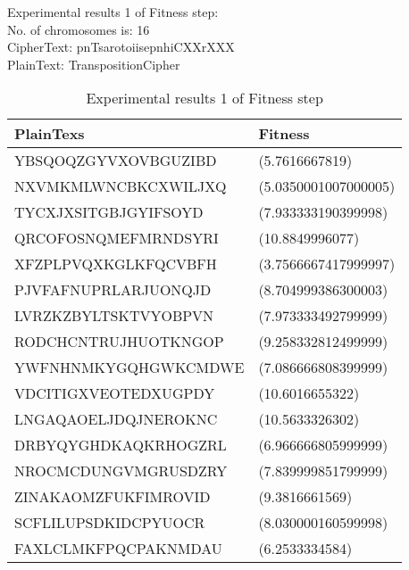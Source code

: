 \textsf{Experimental results 1 of Fitness step:}\\
    \colorbox{blue!30}{\textsf{     No. of chromosomes is: 16}}\\
    \colorbox{blue!30}{\textsf{     CipherText: pnTsarotoiisepnhiCXXrXXX}}\\
    \colorbox{blue!30}{\textsf{     PlainText: TranspositionCipher}}

\begin{table}[H]
\centering
\begin{tabular}{l l}
    \hline
    \cellcolor[gray]{0.9} PlainTexs& \cellcolor[gray]{0.9} Fitness\\ \hline
    YBSQOQZGYVXOVBGUZIBD&(5.7616667819)\\ \hline  
    NXVMKMLWNCBKCXWILJXQ&(5.0350001007000005)\\ \hline  
    TYCXJXSITGBJGYIFSOYD&(7.933333190399998)\\ \hline  
    QRCOFOSNQMEFMRNDSYRI&(10.8849996077)\\ \hline  
    XFZPLPVQXKGLKFQCVBFH&(3.7566667417999997)\\ \hline  
    PJVFAFNUPRLARJUONQJD&(8.704999386300003)\\ \hline  
    LVRZKZBYLTSKTVYOBPVN&(7.973333492799999)\\ \hline  
    RODCHCNTRUJHUOTKNGOP&(9.258332812499999)\\ \hline  
    YWFNHNMKYGQHGWKCMDWE&(7.086666808399999)\\ \hline  
    VDCITIGXVEOTEDXUGPDY&(10.6016655322)\\ \hline  
    LNGAQAOELJDQJNEROKNC&(10.5633326302)\\ \hline  
    DRBYQYGHDKAQKRHOGZRL&(6.966666805999999)\\ \hline  
    NROCMCDUNGVMGRUSDZRY&(7.839999851799999)\\ \hline  
    ZINAKAOMZFUKFIMROVID&(9.3816661569)\\ \hline  
    SCFLILUPSDKIDCPYUOCR&(8.030000160599998)\\ \hline  
    FAXLCLMKFPQCPAKNMDAU&(6.2533334584)\\ \hline  
\end{tabular}
\caption{Experimental results 1 of Fitness step}

\end{table}


